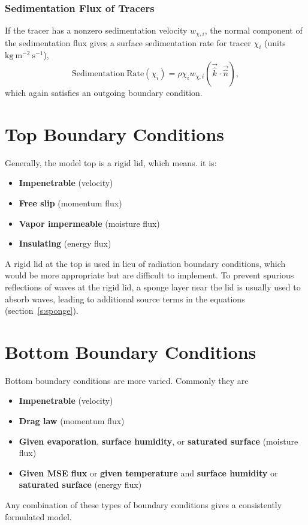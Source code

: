 \documentclass{report}
\begin{document}
\subsubsection{Sedimentation Flux of Tracers}

If the tracer has a nonzero sedimentation velocity $w_{\chi, i}$, the normal component of the sedimentation flux gives a surface sedimentation rate for tracer $\chi_i$ (units $\mathrm{kg~m^{-2}~s^{-1}}$), 
\begin{equation}
    \mathrm{Sedimentation~Rate}(\chi_i) = \rho \chi_{i} w_{\chi, i} (\vec{\hat k} \cdot \vec{\hat n}),
\end{equation}
which again satisfies an outgoing boundary condition. 

\section{Top Boundary Conditions} 

Generally, the model top is a rigid lid, which means. it is:
\begin{itemize}
    \item \textbf{Impenetrable} (velocity)
    \item \textbf{Free slip} (momentum flux)
    \item \textbf{Vapor impermeable} (moisture flux)
    \item \textbf{Insulating} (energy flux)
\end{itemize}
A rigid lid at the top is used in lieu of radiation boundary conditions, which would be more appropriate but are difficult to implement. To prevent spurious reflections of waves at the rigid lid, a sponge layer near the lid is usually used to absorb waves, leading to additional source terms in the equations (section~\ref{s:sponge}).

\section{Bottom Boundary Conditions} \label{s:bottom_bc}

Bottom boundary conditions are more varied. Commonly they are
\begin{itemize}
    \item \textbf{Impenetrable} (velocity)
    \item \textbf{Drag law} (momentum flux)
    \item \textbf{Given evaporation}, \textbf{surface humidity}, or \textbf{saturated surface} (moisture flux)
    \item \textbf{Given MSE flux} or \textbf{given temperature} and \textbf{surface humidity} or \textbf{saturated surface} (energy flux)
\end{itemize}
Any combination of these types of boundary conditions gives a consistently formulated model.
\end{document}
